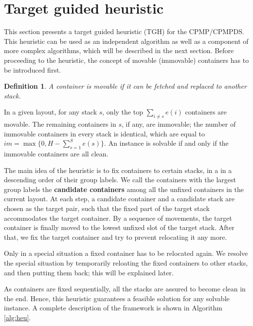 \documentclass[review,3p,times,authoryear,12pt]{elsarticle}
\newtheorem{definition}{Definition}
\begin{document}
\section{Target guided heuristic}
\label{sec:heu}

This section presents a target guided heuristic (TGH) for the CPMP/CPMPDS. 
This heuristic can be used as an independent algorithm as well as a component of more complex algorithms, which will be described in the next section. 
Before proceeding to the heuristic, the concept of movable (immovable) containers has to be introduced first.

\begin{definition}
\label{def:1}
A container is movable if it can be fetched and replaced to another stack.
\end{definition}

In a given layout, for any stack $s$, only the top $\sum_{i\neq s}e(i)$ containers are movable. 
The remaining containers in $s$, if any, are immovable; the number of immovable containers in every stack is identical, which are equal to $\mathit{im}=\max\{0, H-\sum_{s=1}^S e(s)\}$.
An instance is solvable if and only if the immovable containers are all clean.

The main idea of the heuristic is to fix containers to certain stacks, in a in a descending order of their group labels.
We call the containers with the largest group labels the \textbf{candidate containers} among all the unfixed containers in the current layout.
At each step, a candidate container and a candidate stack are chosen as the target pair, such that the fixed part of the target stack accommodates the target container.
By a sequence of movements, the target container is finally moved to the lowest unfixed slot of the target stack.
After that, we fix the target container and try to prevent relocating it any more.

Only in a special situation a fixed container has to be relocated again. 
We resolve the special situation by temporarily reloating the fixed containers to other stacks, and then putting them back; this will be explained later.

As containers are fixed sequentially, all the stacks are assured to become clean in the end. 
Hence, this heuristic guarantees a feasible solution for any solvable instance. 
A complete description of the framework is shown in Algorithm \ref{alg:heu}.
\end{document}
